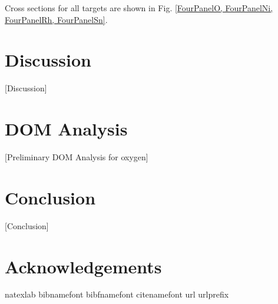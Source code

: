 \documentclass[twocolumn,secnumarabic,amssymb, nobibnotes, aps, prl,
superscriptaddress, nobalancelastpage]{revtex4}
\begin{document}
Cross sections for all targets are shown in Fig. \ref{FourPanelO, FourPanelNi,
FourPanelRh, FourPanelSn}.

\section{Discussion}

[Discussion]

\section{DOM Analysis}

[Preliminary DOM Analysis for oxygen]

\section{Conclusion}

[Conclusion]

\section{Acknowledgements}


\begin{thebibliography}{32} \expandafter\ifx\csname
        natexlab\endcsname\relax\def\natexlab#1{#1}\fi \expandafter\ifx\csname
        bibnamefont\endcsname\relax \def\bibnamefont#1{#1}\fi
        \expandafter\ifx\csname bibfnamefont\endcsname\relax
        \def\bibfnamefont#1{#1}\fi \expandafter\ifx\csname
        citenamefont\endcsname\relax \def\citenamefont#1{#1}\fi
        \expandafter\ifx\csname url\endcsname\relax \def\url#1{\texttt{#1}}\fi
        \expandafter\ifx\csname urlprefix\endcsname\relax\def\urlprefix{URL
        }\fi \providecommand{\bibinfo}[2]{#2}
        \providecommand{\eprint}[2][]{\url{#2}}

\end{thebibliography}
\end{document}
